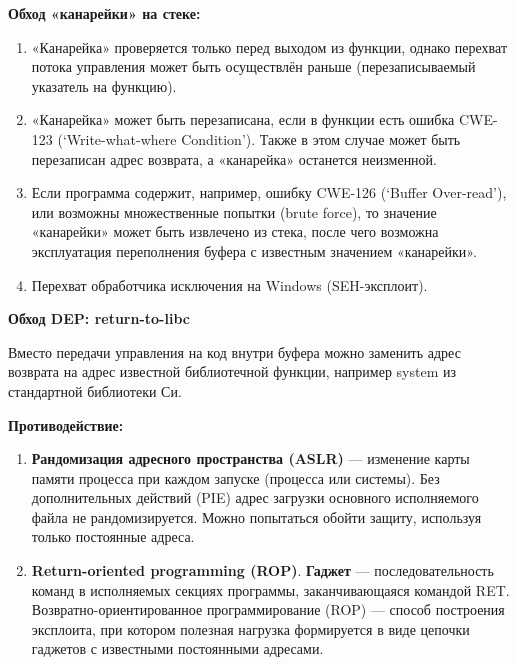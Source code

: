 \textbf{Обход «канарейки» на стеке:}
\begin{enumerate}
    \item «Канарейка» проверяется только перед выходом из функции, однако перехват потока управления может быть осуществлён раньше (перезаписываемый указатель на функцию).
    \item «Канарейка» может быть перезаписана, если в функции есть ошибка CWE-123 (‘Write-what-where Condition’). Также в этом случае может быть перезаписан адрес возврата, а «канарейка» останется неизменной.
    \item Если программа содержит, например, ошибку CWE-126 (‘Buffer Over-read’), или возможны множественные попытки (brute force), то значение «канарейки» может быть извлечено из стека, после чего возможна эксплуатация переполнения буфера с известным значением «канарейки».
    \item Перехват обработчика исключения на Windows (SEH-эксплоит).
\end{enumerate}

\textbf{Обход DEP: return-to-libc}
 
Вместо передачи управления на код внутри буфера можно заменить адрес возврата на адрес известной библиотечной функции, например system из стандартной библиотеки Си. 

\textbf{Противодействие:}
\begin{enumerate}


    \item \textbf{Рандомизация адресного пространства (ASLR)} — изменение карты памяти процесса при каждом запуске (процесса или системы). Без дополнительных действий (PIE) адрес загрузки основного исполняемого файла не рандомизируется. Можно попытаться обойти защиту, используя только постоянные адреса.
    \item  \textbf{Return-oriented programming (ROP)}. \textbf{Гаджет} — последовательность команд в исполняемых секциях программы, заканчивающаяся командой RET. Возвратно-ориентированное программирование (ROP) — способ построения эксплоита, при котором полезная нагрузка формируется в виде цепочки гаджетов с известными постоянными адресами. 
\end{enumerate}